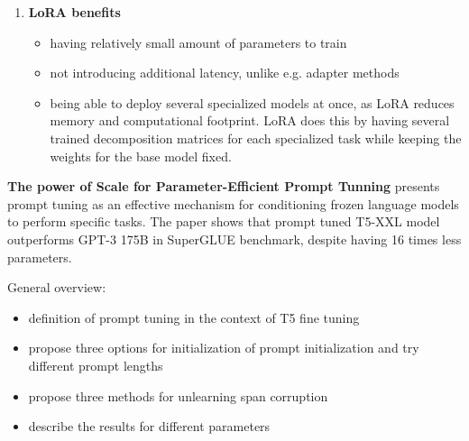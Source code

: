 \begin{enumerate}
    \item \textbf{LoRA benefits}
    
    \begin{itemize}
        \item having relatively small amount of parameters to train
        \item not introducing additional latency, unlike e.g. adapter methods
        \item being able to deploy several specialized models at once, as LoRA reduces memory and computational footprint. LoRA does this by having several trained decomposition matrices for each specialized task while keeping the weights for the base model fixed.
    \end{itemize}
\end{enumerate}



\textbf{The power of Scale for Parameter-Efficient Prompt Tunning}\cite{lester2021power} presents prompt tuning as an effective mechanism for conditioning frozen language models to perform specific tasks. The paper shows that prompt tuned T5-XXL model outperforms GPT-3 175B in SuperGLUE benchmark, despite having 16 times less parameters.


General overview:

\begin{itemize}
    \item definition of prompt tuning in the context of T5 fine tuning
    \item propose three options for initialization of prompt initialization and try different prompt lengths
    \item propose three methods for unlearning span corruption
    \item describe the results for different parameters
\end{itemize}

